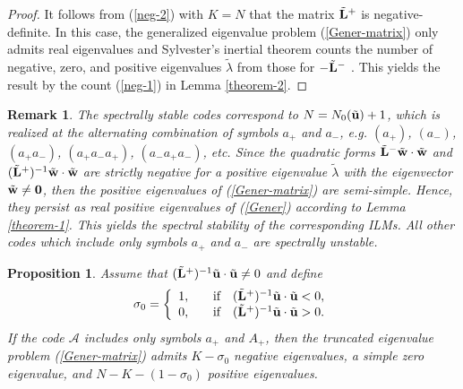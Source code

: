 \documentclass[12pt,reqno]{amsart}
\newtheorem{remark}{Remark}
\newtheorem{prop}{Proposition}
\begin{document}
\begin{proof}
It follows from (\ref{neg-2}) with $K = N$ that the matrix $\tilde{\bf L}^+$ is negative-definite. In this case, the generalized eigenvalue problem (\ref{Gener-matrix}) only admits real eigenvalues and Sylvester's inertial theorem counts the number of negative, zero, and positive eigenvalues $\tilde{\lambda}$ from those for $-\tilde{\bf L}^-$ \cite{Gelfand}. This yields the result by the count (\ref{neg-1}) in Lemma \ref{theorem-2}.
\end{proof}

\begin{remark}
	The spectrally stable codes correspond to $N = N_0(\tilde{\bf u}) + 1$, 
	which is realized at the alternating combination of symbols $a_+$ and $a_-$, e.g. $(a_+)$, $(a_-)$, $(a_+a_-)$, $(a_+a_-a_+)$, $(a_-a_+a_-)$, etc. Since the quadratic forms $\tilde{\bf L}^- \tilde{\bf w}  \cdot \tilde{\bf w} $ and  $(\tilde{\bf L}^+)^{-1} \tilde{\bf w}  \cdot \tilde{\bf w} $ are strictly negative for a positive eigenvalue $\tilde{\lambda}$ with the eigenvector $\tilde{\bf w} \neq {\bf 0}$, then the positive eigenvalues of (\ref{Gener-matrix}) are semi-simple. Hence, they persist as real positive eigenvalues of (\ref{Gener}) according to Lemma \ref{theorem-1}. This yields the spectral stability of the corresponding ILMs. 
	All other codes which include only symbols $a_+$ and $a_-$ are spectrally unstable. 
\end{remark}



\begin{prop}
	\label{prop-3}
	Assume that $(\tilde{\bf L}^+)^{-1} \tilde{\bf u} \cdot \tilde{\bf u} \neq 0$ and define 
	$$
	\sigma_0 = \left\{ \begin{array}{ll} 1, \quad & \mbox{\rm if} \quad (\tilde{\bf L}^+)^{-1} \tilde{\bf u} \cdot \tilde{\bf u} < 0, \\
	0, \quad & \mbox{\rm if} \quad  (\tilde{\bf L}^+)^{-1} \tilde{\bf u} \cdot \tilde{\bf u} > 0. \end{array} \right.
	$$
	If the code $\mathcal{A}$ includes only symbols $a_+$ and $A_+$, then 
	the truncated eigenvalue problem (\ref{Gener-matrix}) admits $K - \sigma_0$ negative eigenvalues, a simple zero eigenvalue, and $N - K - (1-\sigma_0)$ positive eigenvalues.
\end{prop}
\end{document}
